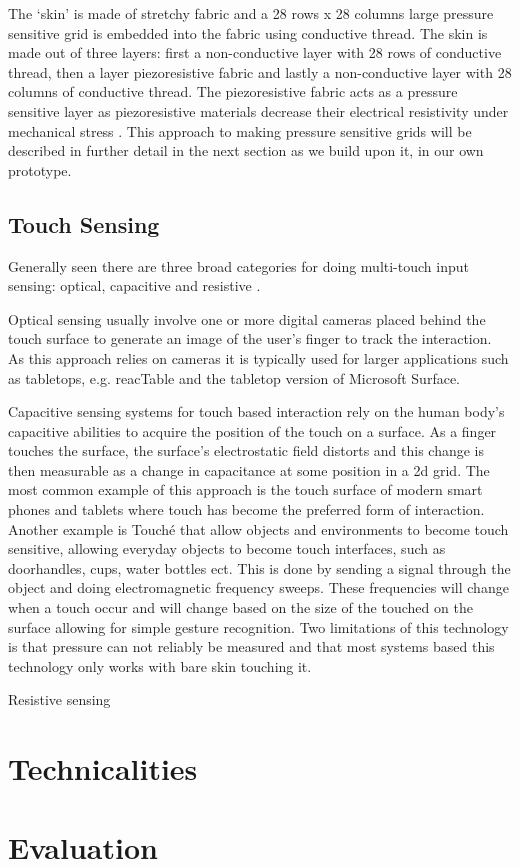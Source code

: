 The `skin' is made of stretchy fabric and a 28 rows x 28 columns large pressure sensitive grid is embedded into the fabric using conductive thread.
The skin is made out of three layers: first a non-conductive layer with 28 rows of conductive thread, then a layer piezoresistive fabric and lastly a non-conductive layer with 28 columns of conductive thread.
The piezoresistive fabric acts as a pressure sensitive layer as piezoresistive materials decrease their electrical resistivity under mechanical stress \citep{piezoresistiveWIKIPEDIA}.
This approach to making pressure sensitive grids will be described in further detail in the next section as we build upon it, in our own prototype.

\subsection{Touch Sensing}
Generally seen there are three broad categories for doing multi-touch input sensing: optical, capacitive and resistive \citep{rosenberg2009unmousepad}.

Optical sensing usually involve one or more digital cameras placed behind the touch surface to generate an image of the user's finger to track the interaction.
As this approach relies on cameras it is typically used for larger applications such as tabletops, e.g. reacTable \citep{jorda2007reactable} and the tabletop version of Microsoft Surface.

Capacitive sensing systems for touch based interaction rely on the human body's capacitive abilities to acquire the position of the touch on a surface. 
As a finger touches the surface, the surface's electrostatic field distorts and this change is then measurable as a change in capacitance at some position in a 2d grid.
The most common example of this approach is the touch surface of modern smart phones and tablets where touch has become the preferred form of interaction.
Another example is Touch\'e \citep{sato2012touche} that allow objects and environments to become touch sensitive, allowing everyday objects to become touch interfaces, such as doorhandles, cups, water bottles ect.
This is done by sending a signal through the object and doing electromagnetic frequency sweeps. 
These frequencies will change when a touch occur and will change based on the size of the touched on the surface allowing for simple gesture recognition.
Two limitations of this technology is that pressure can not reliably be measured and that most systems based this technology only works with bare skin touching it.    

Resistive sensing
\section{Technicalities}
\section{Evaluation}